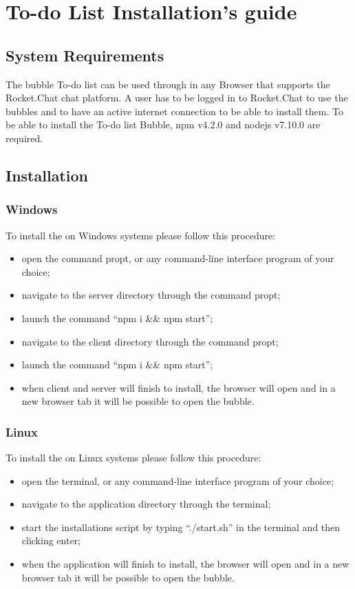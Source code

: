 \section{To-do List Installation's guide}

\subsection{System Requirements}
The bubble To-do list can be used through  in any Browser that supports the Rocket.Chat chat platform.
A user has to be logged in to Rocket.Chat to use the bubbles and to have an active internet connection to be able to install them.
To be able to install the To-do list Bubble, npm v4.2.0 and nodejs v7.10.0 are required.

\subsection{Installation}
\subsubsection{Windows}

To install the \DemoName{} on Windows systems please follow this procedure:
\begin{itemize}
	\item open the command propt, or any command-line interface program of your choice;
	\item navigate to the server directory through the command propt;
	\item launch the command ``npm i \&\& npm start'';
	\item navigate to the client directory through the command propt;
	\item launch the command ``npm i \&\& npm start'';
	\item when client and server will finish to install, the browser will open and in a new browser tab it will be possible to open the bubble.
\end{itemize}

\subsubsection{Linux}
To install the \DemoName{} on Linux systems please follow this procedure:
\begin{itemize}
	\item open the terminal, or any command-line interface program of your choice;
	\item navigate to the application directory through the terminal; 
	\item start the installations script by typing ``./start.sh'' in the terminal and then clicking enter;
	\item when the application will finish to install, the browser will open and in a new browser tab it will be possible to open the bubble.
\end{itemize}

